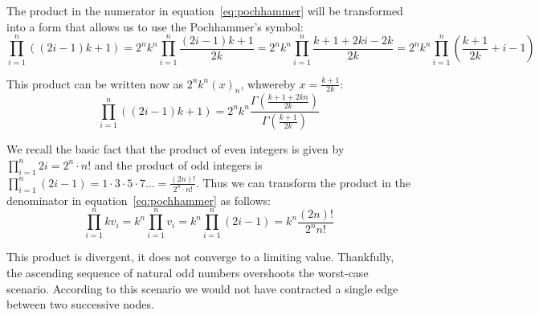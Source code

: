 The product in the numerator in equation~\ref{eq:pochhammer} will be transformed into a form that allows us to use the Pochhammer’s symbol:
\[\prod_{i=1}^{n}\left((2i-1)k+1\right)=2^nk^n\prod_{i=1}^{n}\frac{(2i-1)k+1}{2k}=2^nk^n\prod_{i=1}^{n}\frac{k+1+2ki-2k}{2k}=2^nk^n\prod_{i=1}^{n}\left(\frac{k+1}{2k}+i-1\right)\]

This product can be written now as $2^nk^n(x)_n$, whwereby $x=\frac{k+1}{2k}$:
\[\prod_{i=1}^{n}\left((2i-1)k+1\right)=2^nk^n\frac{\Gamma\left(\frac{k+1+2kn}{2k}\right)}{\Gamma\left(\frac{k+1}{2k}\right)}\]

We recall the basic fact that the product of even integers is given by $\prod_{i=1}^{n}2i=2^n\cdot n!$ and the product of odd integers is $\prod_{i=1}^{n}\left(2i-1\right)=1\cdot3\cdot5\cdot7\ldots=\frac{(2n)!}{2^n\cdot n!}$. Thus we can transform the product in the denominator in equation~\ref{eq:pochhammer} as follows:
\[\prod_{i=1}^{n}kv_i=k^n\prod_{i=1}^{n}v_i=k^n\prod_{i=1}^{n}(2i-1)=k^n\frac{(2n)!}{2^nn!}\]

\par\medskip
This product is divergent, it does not converge to a limiting value. Thankfully, the ascending sequence of natural odd numbers overshoots the worst-case scenario. According to this scenario we would not have contracted a single edge between two successive nodes.
